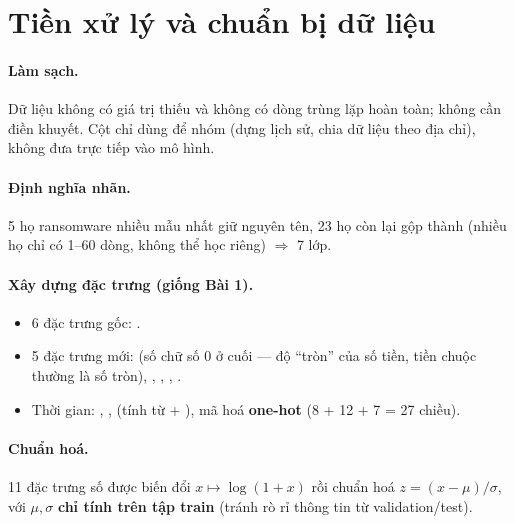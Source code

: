 \section{Tiền xử lý và chuẩn bị dữ liệu}\label{sec:prep}

\paragraph{Làm sạch.} Dữ liệu không có giá trị thiếu và không có dòng trùng lặp hoàn toàn; không cần điền khuyết.
Cột  chỉ dùng để nhóm (dựng lịch sử, chia dữ liệu theo địa chỉ), không đưa trực tiếp vào mô hình.

\paragraph{Định nghĩa nhãn.} 5 họ ransomware nhiều mẫu nhất giữ nguyên tên, 23 họ còn lại gộp thành 
(nhiều họ chỉ có 1--60 dòng, không thể học riêng) $\Rightarrow$ 7 lớp.

\paragraph{Xây dựng đặc trưng (giống Bài 1).}
\begin{itemize}
\item 6 đặc trưng gốc: .
\item 5 đặc trưng mới:  (số chữ số 0 ở cuối  --- độ ``tròn'' của số tiền, tiền chuộc thường là số tròn),
  , , , .
\item Thời gian: , ,  (tính từ  + ), mã hoá \textbf{one-hot}
  (8 + 12 + 7 = 27 chiều).
\end{itemize}

\paragraph{Chuẩn hoá.} 11 đặc trưng số được biến đổi $x \mapsto \log(1+x)$ rồi chuẩn hoá $z=(x-\mu)/\sigma$, với $\mu,\sigma$
\textbf{chỉ tính trên tập train} (tránh rò rỉ thông tin từ validation/test).

